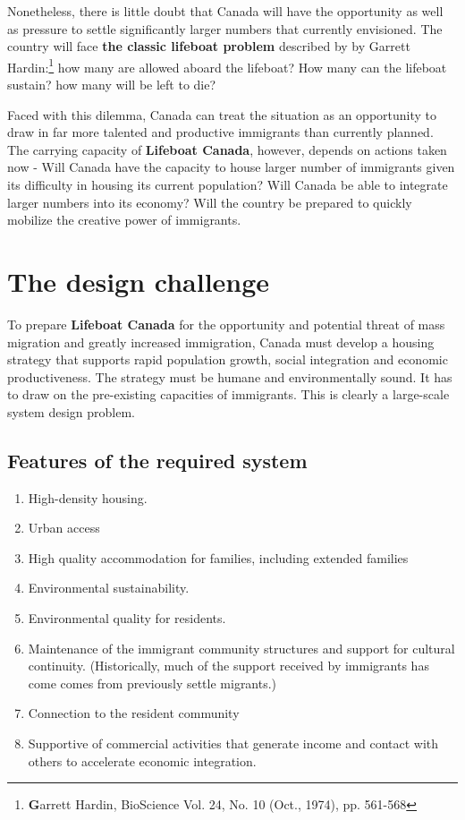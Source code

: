 Nonetheless, there is little doubt that Canada will have the opportunity as well as pressure to settle significantly larger numbers that currently envisioned. 
The country will face \textbf{the classic lifeboat problem}  described by by Garrett Hardin:\footnote{\textbf Garrett Hardin, BioScience Vol. 24, No. 10 (Oct., 1974), pp. 561-568 } how many are allowed aboard the lifeboat?  How many can the lifeboat sustain? how many will be left to die?

Faced with this dilemma, Canada can treat the situation as an opportunity to draw in far more talented and productive immigrants  than currently planned. 
The carrying capacity of \textbf{Lifeboat Canada}, however, depends on actions taken now - Will Canada have the capacity to house larger number of  immigrants given its difficulty in housing its current population?  Will Canada be able to integrate larger numbers into its economy? Will the country be prepared to quickly mobilize  the creative power of immigrants.

\section{The design challenge}
To prepare \textbf{Lifeboat Canada} for the opportunity and 
potential threat of mass migration and greatly increased immigration, Canada must develop a housing strategy that supports rapid population growth, social integration and economic productiveness. The strategy must be humane and environmentally sound. It has to draw on the pre-existing capacities of immigrants. This is clearly a large-scale system design problem.

\subsection{Features of the required system}

\begin{enumerate}
    \item High-density housing.
    \item Urban access
    \item High quality accommodation for families, including extended families  
    \item Environmental sustainability.
    \item Environmental quality for residents.
    \item Maintenance of the immigrant community structures and support for cultural continuity. 
    (Historically, much of the support received by immigrants has come comes from previously settle migrants.) 
    \item Connection to the resident community
    \item Supportive of commercial activities that generate income 
    and contact with others to accelerate economic integration.
\end{enumerate}
